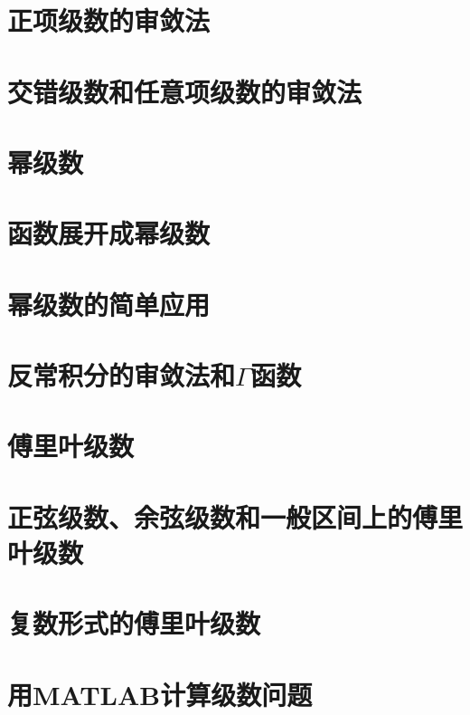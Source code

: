 \section{正项级数的审敛法}

\section{交错级数和任意项级数的审敛法}

\section{幂级数}

\section{函数展开成幂级数}

\section{幂级数的简单应用}

\section{反常积分的审敛法和$\Gamma$函数}

\section{傅里叶级数}

\section{正弦级数、余弦级数和一般区间上的傅里叶级数}

\section{复数形式的傅里叶级数}

\section{用MATLAB计算级数问题}




